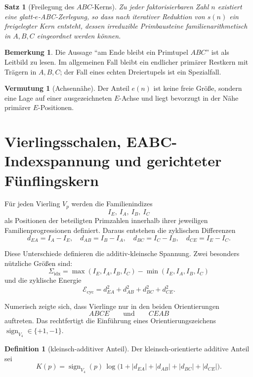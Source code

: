 \documentclass[11pt,a4paper]{article}
\newtheorem{satz}{Satz}
\theoremstyle{definition}
\newtheorem{definition}{Definition}
\newtheorem{bemerkung}{Bemerkung}
\newtheorem{vermutung}{Vermutung}
\begin{document}
\begin{satz}[Freilegung des $ABC$-Kerns]
Zu jeder faktorisierbaren Zahl $n$ existiert eine glatt-$e$-ABC-Zerlegung, so dass nach iterativer Reduktion von $s(n)$ ein freigelegter Kern entsteht, dessen irreduzible Primbausteine familienarithmetisch in $A,B,C$ eingeordnet werden können.
\end{satz}

\begin{bemerkung}
Die Aussage ``am Ende bleibt ein Primtupel $ABC$'' ist als Leitbild zu lesen. Im allgemeinen Fall bleibt ein endlicher primärer Restkern mit Trägern in $A,B,C$; der Fall eines echten Dreiertupels ist ein Spezialfall.
\end{bemerkung}

\begin{vermutung}[Achsennähe]
Der Anteil $e(n)$ ist keine freie Größe, sondern eine Lage auf einer ausgezeichneten $E$-Achse und liegt bevorzugt in der Nähe primärer $E$-Positionen.
\end{vermutung}

\section{Vierlingsschalen, EABC-Indexspannung und gerichteter Fünflingskern}

Für jeden Vierling $V_p$ werden die Familienindizes
\[
I_E,\ I_A,\ I_B,\ I_C
\]
als Positionen der beteiligten Primzahlen innerhalb ihrer jeweiligen Familienprogressionen definiert. Daraus entstehen die zyklischen Differenzen
\[
d_{EA}=I_A-I_E,\quad d_{AB}=I_B-I_A,\quad d_{BC}=I_C-I_B,\quad d_{CE}=I_E-I_C.
\]

Diese Unterschiede definieren die additiv-kleinsche Spannung. Zwei besonders nützliche Größen sind:
\[
\Sigma_{\mathrm{idx}}=\max(I_E,I_A,I_B,I_C)-\min(I_E,I_A,I_B,I_C)
\]
und die zyklische Energie
\[
\mathcal E_{\mathrm{cyc}}=d_{EA}^2+d_{AB}^2+d_{BC}^2+d_{CE}^2.
\]

Numerisch zeigte sich, dass Vierlinge nur in den beiden Orientierungen
\[
ABCE\qquad\text{und}\qquad CEAB
\]
auftreten. Das rechtfertigt die Einführung eines Orientierungszeichens $\operatorname{sign}_{V_4}\in\{+1,-1\}$.

\begin{definition}[kleinsch-additiver Anteil]
Der kleinsch-orientierte additive Anteil sei
\[
K(p)=\operatorname{sign}_{V_4}(p)\,\log\bigl(1+|d_{EA}|+|d_{AB}|+|d_{BC}|+|d_{CE}|\bigr).
\]
\end{definition}
\end{document}
